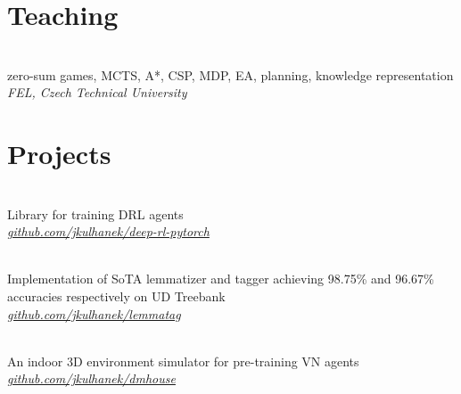 \documentclass[a4paper]{deedy-resume}
\begin{document}
\begin{minipage}[t]{0.33\textwidth}
\sectionspace

\section{Teaching}
\\
zero-sum games, MCTS, A*, CSP, MDP, EA, planning, knowledge representation\\

\textit{FEL, Czech Technical University}
\sectionspace


\section{Projects}
\\
Library for training DRL agents\\
\href{https://github.com/jkulhanek/deep-rl-pytorch}{\textit{github.com/jkulhanek/deep-rl-pytorch}}
\sectionspace

\\
Implementation of SoTA lemmatizer and tagger achieving 98.75\% and 96.67\% accuracies respectively on UD Treebank\\
\href{https://github.com/jkulhanek/lemmatag}{\textit{github.com/jkulhanek/lemmatag}}
\sectionspace

\\
An indoor 3D environment simulator for pre-training VN agents\\
\href{https://github.com/jkulhanek/dmhouse}{\textit{github.com/jkulhanek/dmhouse}}
\sectionspace



\vspace{-1cm}

\end{minipage} %
\hfill
\end{document}
